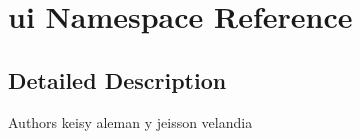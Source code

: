 \hypertarget{namespaceui}{}\section{ui Namespace Reference}
\label{namespaceui}


\subsection{Detailed Description}
\begin{DoxyAuthor}{Authors}
keisy aleman y jeisson velandia 
\end{DoxyAuthor}

